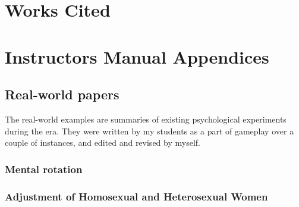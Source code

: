 \begin{refsection}
\chapter{Works Cited\printbibliography[heading=subbibliography]}
\label{workscited--printbibliographyheadingsubbibliography--}

\pagebreak 

 \renewcommand*{\thechapter}{}
\renewcommand*{\thesection}{\Alph{section}}
\setcounter{chapter}{0}
\renewcommand*{\thesubsection}{\arabic{subsection}}



\chapter{Instructors Manual Appendices}
\label{instructorsmanualappendices}

\begin{appendices}
\let\svaddcontentsline\addcontentsline
\renewcommand\addcontentsline[3]{%
  \ifthenelse{\equal{#1}{lof}}{}%
  {\ifthenelse{\equal{#1}{lot}}{}{\svaddcontentsline{#1}{#2}{#3}}}}





\section{Real-world papers}
\label{real-worldpapers}

The real-world examples are summaries of existing psychological experiments during the era. They were written by my students as a part of gameplay over a couple of instances, and edited and revised by myself.

\subsection{Mental rotation}
\label{mentalrotation}

\label{paper: mentalrotation}


\subsection{Adjustment of Homosexual and Heterosexual Women}
\label{adjustmentofhomosexualandheterosexualwomen}

\label{paper: observation}



\end{appendices}
\end{refsection}
